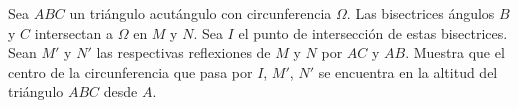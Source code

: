 Sea $ABC$ un triángulo acutángulo con circunferencia $\Omega$. Las bisectrices ángulos $B$ y $C$ intersectan a $\Omega$ en $M$ y $N$. Sea $I$ el punto de intersección de estas bisectrices. Sean $M'$ y $N'$ las respectivas reflexiones de $M$ y $N$ por $AC$ y $AB$. Muestra que el centro de la circunferencia que pasa por $I$, $M'$, $N'$ se encuentra en la altitud del triángulo $ABC$ desde $A$.
